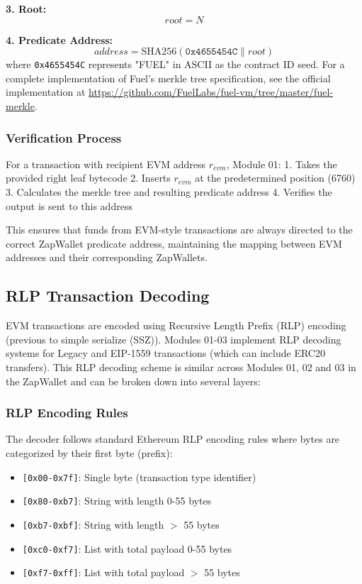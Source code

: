 \textbf{3. Root:}
\[ root = N \]

\textbf{4. Predicate Address:}
\[ address = \text{SHA256}(\texttt{0x4655454C} \parallel root) \]
where \texttt{0x4655454C} represents "FUEL" in ASCII as the contract ID seed. For a complete
implementation of Fuel's merkle tree specification, see the official implementation
at \url{https://github.com/FuelLabs/fuel-vm/tree/master/fuel-merkle}.


\subsubsection{Verification Process}
For a transaction with recipient EVM address $r_{evm}$, Module 01:
1. Takes the provided right leaf bytecode
2. Inserts $r_{evm}$ at the predetermined position (6760)
3. Calculates the merkle tree and resulting predicate address
4. Verifies the  output is sent to this address

This ensures that funds from EVM-style transactions are always directed to the correct ZapWallet predicate address,
maintaining the mapping between EVM addresses and their corresponding ZapWallets.







\subsection{RLP Transaction Decoding}
\label{subsec:rlp_decoding}

EVM transactions are encoded using Recursive Length Prefix (RLP) encoding (previous to simple serialize (SSZ)). Modules 01-03 implement
RLP decoding systems for Legacy and EIP-1559 transactions (which can include ERC20 transfers). This RLP decoding scheme
is similar across Modules 01, 02 and 03 in the ZapWallet and can be broken down into several layers:

\subsubsection{RLP Encoding Rules}
The decoder follows standard Ethereum RLP encoding rules where bytes are categorized by their first byte (prefix):
\begin{itemize}
    \item \texttt{[0x00-0x7f]}: Single byte (transaction type identifier)
    \item \texttt{[0x80-0xb7]}: String with length 0-55 bytes
    \item \texttt{[0xb7-0xbf]}: String with length $>$ 55 bytes
    \item \texttt{[0xc0-0xf7]}: List with total payload 0-55 bytes
    \item \texttt{[0xf7-0xff]}: List with total payload $>$ 55 bytes
\end{itemize}


